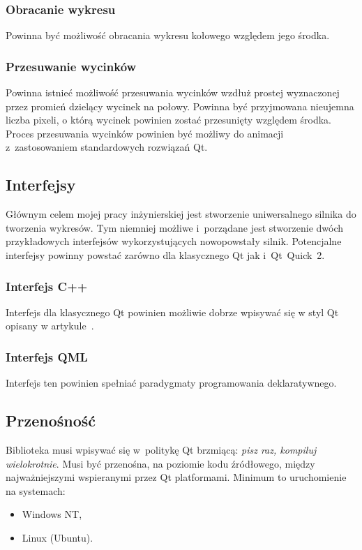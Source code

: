 \documentclass[11pt,twoside,a4paper,final]{article}
\begin{document}
\subsubsection{Obracanie wykresu}
Powinna być możliwość obracania wykresu kołowego względem jego środka.

\subsubsection{Przesuwanie wycinków}
Powinna istnieć możliwość przesuwania wycinków wzdłuż prostej wyznaczonej przez promień dzielący wycinek na połowy. Powinna być przyjmowana nieujemna liczba pixeli, o którą wycinek powinien zostać przesunięty względem środka. Proces przesuwania wycinków powinien być możliwy do animacji z~zastosowaniem standardowych rozwiązań Qt.
 
\subsection{Interfejsy}
Głównym celem mojej pracy inżynierskiej jest stworzenie uniwersalnego silnika do tworzenia wykresów. Tym niemniej możliwe i~porządane jest stworzenie dwóch przykładowych interfejsów wykorzystujących nowopowstały silnik. Potencjalne interfejsy powinny powstać zarówno dla klasycznego Qt jak i~Qt~Quick~2. 

\subsubsection{Interfejs C++}
Interfejs dla klasycznego Qt powinien możliwie dobrze wpisywać się w styl Qt opisany w artykule~\cite{qt-style-API}.

\subsubsection{Interfejs QML}
Interfejs ten powinien spełniać paradygmaty programowania deklaratywnego.

\subsection{Przenośność}
Biblioteka musi wpisywać się w~politykę Qt brzmiącą: \textit{pisz raz, kompiluj wielokrotnie}. Musi być przenośna, na poziomie kodu źródłowego, między najważniejszymi wspieranymi przez Qt platformami.
Minimum to uruchomienie na systemach:
\begin{itemize}
\item{Windows NT,}
\item{Linux (Ubuntu).}
\end{itemize}
\end{document}
